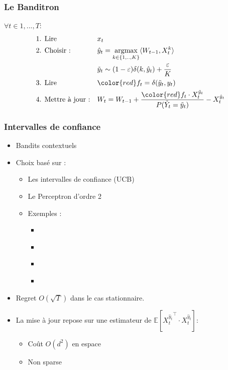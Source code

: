 \documentclass{beamer}
\begin{document}
\begin{frame}
	\frametitle{Le Banditron \cite{kakade2008efficient}}

	\begin{block}{}
		$\forall t \in 1,...,T :$
		\begin{align*}
		&\text{1. Lire } 
		&& x_t 
		\\
		&\text{2. Choisir :} 
		&& \hat{y}_t = \underset{k \in\{1,..,K\}}{\text{argmax}}  \langle W_{t-1}, X_t^k \rangle 
		\\
		& %
		&& \tilde{y}_t \sim (1-\varepsilon) \delta(k,\hat{y}_t) + \frac{\varepsilon}{K} 
		\\	
		&\text{3. Lire } 
		&& {\color{red} f_t = \delta(\tilde{y}_t ,y_t)}  
		\\
		&\text{4. Mettre à jour :} 
		&& W_t = W_{t-1} + \frac{{\color{red}f_t}\cdot X_t^{\tilde{y}_t}}{P(\tilde{Y}_t=\tilde{y}_t)} - X_t^{\hat{y}_t} 
		\end{align*}
	\end{block}

\end{frame}

\begin{frame}\frametitle{Intervalles de confiance}
	\begin{itemize}
		\item Bandits contextuels
		\item Choix basé sur :
		\begin{itemize}
			\item Les intervalles de confiance (UCB)\cite{lai1985asymptotically}
			\item Le Perceptron d'ordre 2 \cite{cesa2005second}
		\item Exemples :
		\begin{itemize}
		 \item\cite{li2010contextual}
		 \item\cite{hazan2011newtron}
		 \item\cite{crammer2013multiclass}
		 \item\cite{ngo2013upper}
		 \end{itemize}
		\end{itemize} 
		\item Regret $O(\sqrt{T})$ dans le cas stationnaire.
		\item La mise à jour repose sur une estimateur de 
		$\mathbb{E}\left[ {X_t^{\hat{y}_t}}^\top \cdot X_t^{\hat{y}_t}\right]$:
		\begin{itemize}
			\item Coût $O(d^2)$ en espace
			\item Non sparse
		\end{itemize}
	\end{itemize}
	
\end{frame}
	
\end{document}
